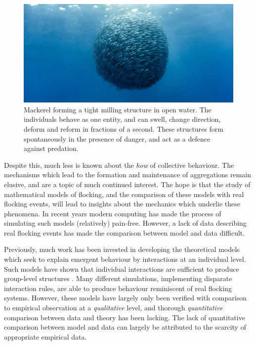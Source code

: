 \begin{figure}[t]
  \includegraphics[width=\textwidth]{milling.jpg}
  \caption{Mackerel forming a tight milling structure in open water. The
    individuals behave as one entity, and can swell, change direction,
    deform and reform in fractions of a second. These structures form
    spontaneously in the presence of danger, and act as a defence against
    predation.}
  \label{fig:milling}
\end{figure}

Despite this, much less is known about the \emph{how} of collective behaviour.
The mechanisms which lead to the formation and maintenance of aggregations
remain elusive, and are a topic of much continued interest. The hope is that
the study of mathematical models of flocking, and the comparison of these
models with real flocking events, will lead to insights about the mechanics
which underlie these phenomena. In recent years modern computing has made the
process of simulating such models (relatively) pain-free. However, a lack of
data describing real flocking events has made the comparison between model and
data difficult.

Previously, much work has been invested in developing the theoretical models
which seek to explain emergent behaviour by interactions at an individual
level. Such models have shown that individual interactions are sufficient to
produce group-level structures \parencite{aoki82}. Many different simulations,
implementing disparate interaction rules, are able to produce behaviour
reminiscent of real flocking systems. However, these models have largely only
been verified with comparison to empirical observation at a \emph{qualitative}
level, and thorough \emph{quantitative} comparison between data and theory has
been lacking. The lack of quantitative comparison between model and data can
largely be attributed to the scarcity of appropriate empirical data.

